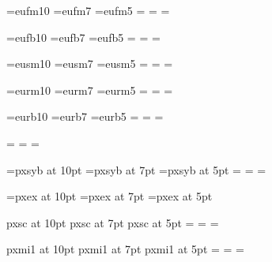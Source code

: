 \def\hexdigit#1{\ifcase#1
  0\or 1\or 2\or 3\or 4\or 5\or 6\or 7\or
  8\or 9\or A\or B\or C\or D\or E\or F\fi}

\font\teneufm=eufm10
\font\seveneufm=eufm7
\font\fiveeufm=eufm5
\newfam\eufmfam
\textfont\eufmfam=\teneufm
\scriptfont\eufmfam=\seveneufm
\scriptscriptfont\eufmfam=\fiveeufm
\def\frak#1{{\fam\eufmfam\relax#1}}

\font\teneufb=eufb10
\font\seveneufb=eufb7
\font\fiveeufb=eufb5
\newfam\eufbfam
\textfont\eufbfam=\teneufb
\scriptfont\eufbfam=\seveneufb
\scriptscriptfont\eufbfam=\fiveeufb
\def\frakb#1{{\fam\eufbfam\relax#1}}

\font\teneusm=eusm10
\font\seveneusm=eusm7
\font\fiveeusm=eusm5
\newfam\eusmfam
\textfont\eusmfam=\teneusm
\scriptfont\eusmfam=\seveneusm
\scriptscriptfont\eusmfam=\fiveeusm
\def\scr#1{{\fam\eusmfam\relax#1}}


\font\teneurm=eurm10
\font\seveneurm=eurm7
\font\fiveeurm=eurm5
\newfam\eurmfam
\textfont\eurmfam=\teneurm
\scriptfont\eurmfam=\seveneurm
\scriptscriptfont\eurmfam=\fiveeurm
\def\eurm#1{{\fam\eurmfam\relax#1}}

\font\teneurb=eurb10
\font\seveneurb=eurb7
\font\fiveeurb=eurb5
\newfam\eurbfam
\textfont\eurbfam=\teneurb
\scriptfont\eurbfam=\seveneurb
\scriptscriptfont\eurbfam=\fiveeurb
\def\eurb#1{{\fam\eurbfam\relax#1}}

\textfont\bffam=\tenbf
\scriptfont\bffam=\sevenbf
\scriptscriptfont\bffam=\fivebf

\font\tenpxsyb=pxsyb at 10pt
\font\sevenpxsyb=pxsyb at 7pt
\font\fivepxsyb=pxsyb at 5pt
\newfam\bbbfam
\textfont\bbbfam=\tenpxsyb
\scriptfont\bbbfam=\sevenpxsyb
\scriptscriptfont\bbbfam=\fivepxsyb
\def\bbb#1{{\fam\bbbfam\relax#1}}
\let\Bbb\bbb

\font\tenpxex=pxex at 10pt
\font\sevenpxex=pxex at 7pt
\font\fivepxex=pxex at 5pt

\font\tenpxsc pxsc at 10pt
\font\sevenpxsc pxsc at 7pt
\font\fivepxsc pxsc at 5pt
\newfam\scfam
\textfont\scfam=\tenpxsc
\scriptfont\scfam=\sevenpxsc
\scriptscriptfont\scfam=\fivepxsc
\def\sc{\tenpxsc\fam\scfam}

\font\tenpxmi pxmi1 at 10pt
\font\sevenpxmi pxmi1 at 7pt
\font\fivepxmi pxmi1 at 5pt
=\tenpxmi
{}=\sevenpxmi
{}=\fivepxmi

